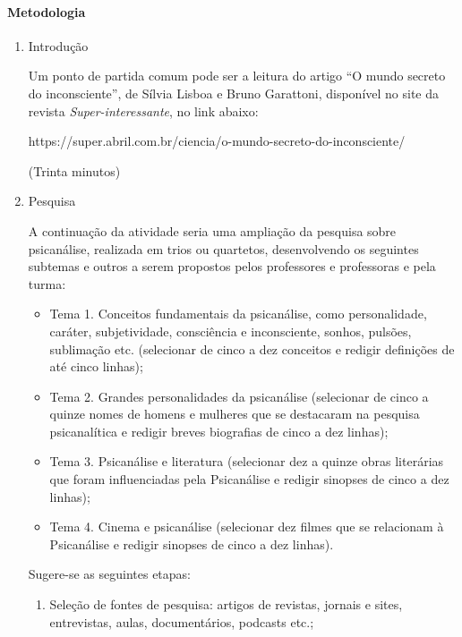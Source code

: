 \documentclass[12pt]{extarticle}
\begin{document}
\paragraph{Metodologia}
\begin{enumerate}
\item
Introdução

Um ponto de partida comum pode ser a leitura do artigo ``O mundo secreto
do inconsciente'', de Sílvia Lisboa e Bruno Garattoni, disponível no
site da revista \emph{Super-interessante}, no link abaixo:

https://super.abril.com.br/ciencia/o-mundo-secreto-do-inconsciente/

(Trinta minutos)

\item
Pesquisa

A continuação da atividade seria uma ampliação da pesquisa sobre
psicanálise, realizada em trios ou quartetos, desenvolvendo os seguintes
subtemas e outros a serem propostos pelos professores e professoras e
pela turma:

\begin{itemize}
\item
Tema 1. Conceitos fundamentais da psicanálise, como personalidade,
caráter, subjetividade, consciência e inconsciente, sonhos, pulsões,
sublimação etc. (selecionar de cinco a dez conceitos e redigir
definições de até cinco linhas);

\item
Tema 2. Grandes personalidades da psicanálise (selecionar de cinco a
quinze nomes de homens e mulheres que se destacaram na pesquisa
psicanalítica e redigir breves biografias de cinco a dez linhas);

\item
Tema 3. Psicanálise e literatura (selecionar dez a quinze obras
literárias que foram influenciadas pela Psicanálise e redigir sinopses
de cinco a dez linhas);

\item
Tema 4. Cinema e psicanálise (selecionar dez filmes que se relacionam à
Psicanálise e redigir sinopses de cinco a dez linhas).
\end{itemize}

Sugere-se as seguintes etapas:

\begin{enumerate}
\item
Seleção de fontes de pesquisa: artigos de revistas, jornais e sites,
entrevistas, aulas, documentários, podcasts etc.;


\end{enumerate}
\end{enumerate}
\end{document}
